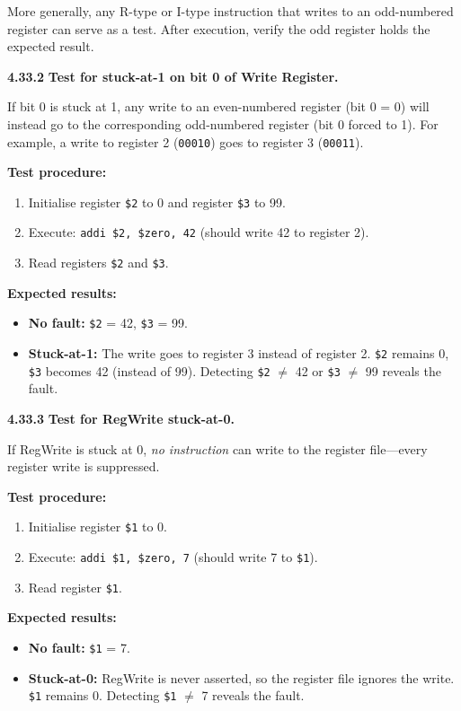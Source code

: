 \noindent More generally, any R-type or I-type instruction that writes to
an odd-numbered register can serve as a test.  After execution, verify the
odd register holds the expected result.

\medskip\noindent\textbf{4.33.2}
\textbf{Test for stuck-at-1 on bit 0 of Write Register.}

If bit 0 is stuck at 1, any write to an even-numbered register (bit 0 = 0)
will instead go to the corresponding odd-numbered register (bit 0 forced
to 1).  For example, a write to register 2 (\texttt{00010}) goes to
register 3 (\texttt{00011}).

\textbf{Test procedure:}
\begin{enumerate}
\item Initialise register \texttt{\$2} to 0 and register \texttt{\$3} to 99.
\item Execute: \texttt{addi \$2, \$zero, 42}
      \quad (should write 42 to register 2).
\item Read registers \texttt{\$2} and \texttt{\$3}.
\end{enumerate}

\textbf{Expected results:}
\begin{itemize}
\item \textbf{No fault:} \texttt{\$2} = 42, \texttt{\$3} = 99. \checkmark
\item \textbf{Stuck-at-1:} The write goes to register 3 instead of register 2.
      \texttt{\$2} remains 0, \texttt{\$3} becomes 42 (instead of 99).
      Detecting \texttt{\$2} $\neq$ 42 or \texttt{\$3} $\neq$ 99 reveals
      the fault.
\end{itemize}

\medskip\noindent\textbf{4.33.3}
\textbf{Test for RegWrite stuck-at-0.}

If RegWrite is stuck at 0, \emph{no instruction} can write to the register
file---every register write is suppressed.

\textbf{Test procedure:}
\begin{enumerate}
\item Initialise register \texttt{\$1} to 0.
\item Execute: \texttt{addi \$1, \$zero, 7}
      \quad (should write 7 to \texttt{\$1}).
\item Read register \texttt{\$1}.
\end{enumerate}

\textbf{Expected results:}
\begin{itemize}
\item \textbf{No fault:} \texttt{\$1} = 7. \checkmark
\item \textbf{Stuck-at-0:} RegWrite is never asserted, so the register file
      ignores the write.  \texttt{\$1} remains 0.  Detecting
      \texttt{\$1} $\neq$ 7 reveals the fault.
\end{itemize}

